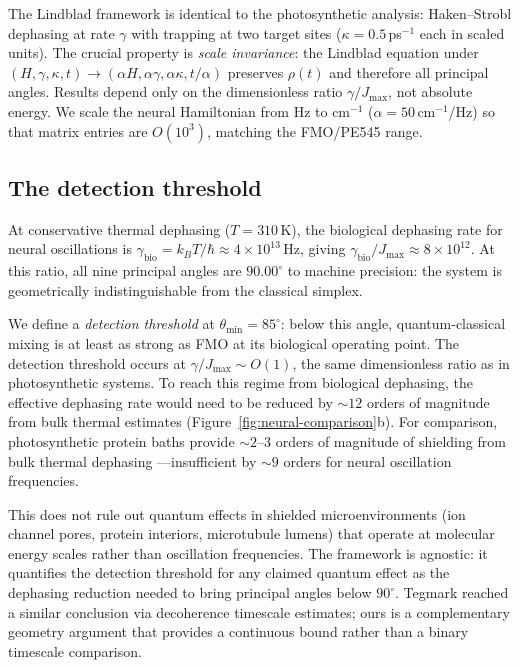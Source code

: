 \documentclass[12pt,a4paper]{article}
\theoremstyle{definition}
\theoremstyle{remark}
\begin{document}
The Lindblad framework is identical to the photosynthetic analysis: Haken--Strobl dephasing at rate $\gamma$ with trapping at two target sites ($\kappa = 0.5$\,ps$^{-1}$ each in scaled units). The crucial property is \emph{scale invariance}: the Lindblad equation under $(H, \gamma, \kappa, t) \to (\alpha H, \alpha\gamma, \alpha\kappa, t/\alpha)$ preserves $\rho(t)$ and therefore all principal angles. Results depend only on the dimensionless ratio $\gamma/J_{\max}$, not absolute energy. We scale the neural Hamiltonian from Hz to cm$^{-1}$ ($\alpha = 50$\,cm$^{-1}$/Hz) so that matrix entries are $O(10^3)$, matching the FMO/PE545 range.

\subsection{The detection threshold}
\label{sec:detection-threshold}

At conservative thermal dephasing ($T = 310$\,K), the biological dephasing rate for neural oscillations is $\gamma_{\mathrm{bio}} = k_BT/\hbar \approx 4 \times 10^{13}$\,Hz, giving $\gamma_{\mathrm{bio}}/J_{\max} \approx 8 \times 10^{12}$. At this ratio, all nine principal angles are $90.00^\circ$ to machine precision: the system is geometrically indistinguishable from the classical simplex.

We define a \emph{detection threshold} at $\theta_{\min} = 85^\circ$: below this angle, quantum-classical mixing is at least as strong as FMO at its biological operating point. The detection threshold occurs at $\gamma/J_{\max} \sim O(1)$, the same dimensionless ratio as in photosynthetic systems. To reach this regime from biological dephasing, the effective dephasing rate would need to be reduced by ${\sim}12$ orders of magnitude from bulk thermal estimates (Figure~\ref{fig:neural-comparison}b). For comparison, photosynthetic protein baths provide ${\sim}2$--$3$ orders of magnitude of shielding from bulk thermal dephasing \cite{cao2020quantum}---insufficient by ${\sim}9$ orders for neural oscillation frequencies.

This does not rule out quantum effects in shielded microenvironments (ion channel pores, protein interiors, microtubule lumens) that operate at molecular energy scales rather than oscillation frequencies. The framework is agnostic: it quantifies the detection threshold for any claimed quantum effect as the dephasing reduction needed to bring principal angles below $90^\circ$. Tegmark \cite{tegmark2000importance} reached a similar conclusion via decoherence timescale estimates; ours is a complementary geometry argument that provides a continuous bound rather than a binary timescale comparison.
\end{document}
